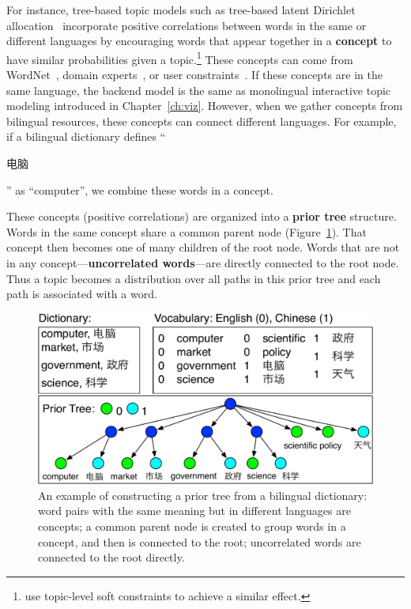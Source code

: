 For instance, tree-based topic models such as tree-based latent Dirichlet 
allocation~\citep[]{boyd-graber-07,andrzejewski-09}
incorporate positive correlations between words in the same or
different languages by encouraging words that appear together in a
{\bf concept} to have similar probabilities given a
topic.\footnote{\citet{Zhang-10} use
  topic-level soft constraints to achieve a similar effect.} These
concepts can come from WordNet~\citep{boyd-graber-10}, domain
experts~\citep{andrzejewski-09}, or user
constraints~\citep{hu-14:itm}. If these concepts are in the same
language, the backend model is the same as monolingual interactive topic modeling
introduced in Chapter~\ref{ch:viz}. However, when we gather concepts
from bilingual resources, these concepts can connect different
languages. For example, if a bilingual dictionary defines
``\begin{CJK*}{UTF8}{gbsn}电脑\end{CJK*}'' as ``computer'', we combine
  these words in a concept.

  These concepts (positive correlations) are organized into a {\bf
    prior tree} structure. Words in the same concept share a common
  parent node (Figure~\ref{fig:prior_trees}). That concept then
  becomes one of many children of the root node.  Words that are not
  in any concept---{\bf uncorrelated words}---are directly connected
  to the root node. Thus a topic becomes a distribution over all paths
  in this prior tree and each path is associated with a word.

\begin{figure}
\centering
\includegraphics[width=0.9\linewidth]{figures/correlations_tree-crop.pdf}
\vspace{-3mm}
\caption[Constructing prior tree from a bilingual dictionary]{An example of constructing a prior tree from a
  bilingual dictionary: word pairs with the same meaning but in
  different languages are concepts; a common parent node is created to
  group words in a concept, and then is connected to the root;
  uncorrelated words are connected to the root directly.}
\label{fig:prior_trees}
\end{figure}

